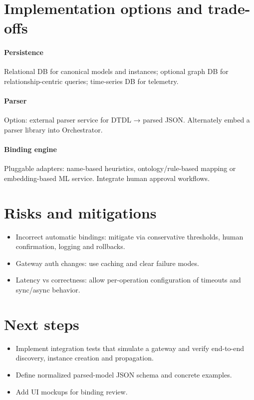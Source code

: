 \documentclass[11pt,a4paper]{article}
\begin{document}
\section{Implementation options and trade-offs}
\paragraph{Persistence}
Relational DB for canonical models and instances; optional graph DB for relationship-centric queries; time-series DB for telemetry.

\paragraph{Parser}
Option: external parser service for DTDL → parsed JSON. Alternately embed a parser library into Orchestrator.

\paragraph{Binding engine}
Pluggable adapters: name-based heuristics, ontology/rule-based mapping or embedding-based ML service. Integrate human approval workflows.

\section{Risks and mitigations}
\begin{itemize}
  \item Incorrect automatic bindings: mitigate via conservative thresholds, human confirmation, logging and rollbacks.
  \item Gateway auth changes: use caching and clear failure modes.
  \item Latency vs correctness: allow per-operation configuration of timeouts and sync/async behavior.
\end{itemize}

\section{Next steps}
\begin{itemize}
  \item Implement integration tests that simulate a gateway and verify end-to-end discovery, instance creation and propagation.
  \item Define normalized parsed-model JSON schema and concrete examples.
  \item Add UI mockups for binding review.
\end{itemize}
\end{document}
